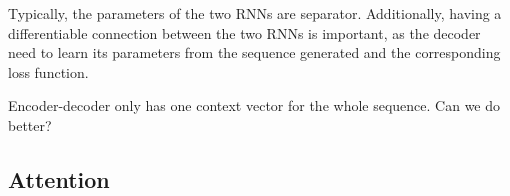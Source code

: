 \documentclass[a4paper]{article}
\begin{document}
Typically, the parameters of the two RNNs are separator. 
Additionally, having a differentiable connection 
between the two RNNs is important, as the decoder 
need to learn its parameters from the sequence 
generated and the corresponding loss function.

Encoder-decoder only has one context vector for the 
whole sequence. Can we do better?

\subsection{Attention}
\end{document}
